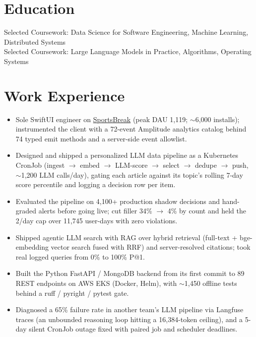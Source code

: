 \documentclass[11pt, letterpaper]{article}
\begin{document}

\section{Education}
Selected Coursework: Data Science for Software Engineering, Machine Learning, Distributed Systems\\[1pt]
Selected Coursework: Large Language Models in Practice, Algorithms, Operating Systems

\section{Work Experience}
\begin{itemize}
  \item Sole SwiftUI engineer on \href{https://apps.apple.com/app/id6762649287}{SportsBreak} (peak DAU 1{,}119; $\sim$6{,}000 installs); instrumented the client with a 72-event Amplitude analytics catalog behind 74 typed emit methods and a server-side event allowlist.
  \item Designed and shipped a personalized LLM data pipeline as a Kubernetes CronJob (ingest $\to$ embed $\to$ LLM-score $\to$ select $\to$ dedupe $\to$ push, $\sim$1{,}200 LLM calls/day), gating each article against its topic's rolling 7-day score percentile and logging a decision row per item.
  \item Evaluated the pipeline on 4{,}100+ production shadow decisions and hand-graded alerts before going live; cut filler 34\% $\to$ 4\% by count and held the 2/day cap over 11{,}745 user-days with zero violations.
  \item Shipped agentic LLM search with RAG over hybrid retrieval (full-text + bge-embedding vector search fused with RRF) and server-resolved citations; took real logged queries from 0\% to 100\% P@1.
  \item Built the Python FastAPI / MongoDB backend from its first commit to 89 REST endpoints on AWS EKS (Docker, Helm), with $\sim$1{,}450 offline tests behind a ruff / pyright / pytest gate.
  \item Diagnosed a 65\% failure rate in another team's LLM pipeline via Langfuse traces (an unbounded reasoning loop hitting a 16{,}384-token ceiling), and a 5-day silent CronJob outage fixed with paired job and scheduler deadlines.
\end{itemize}
\end{document}
